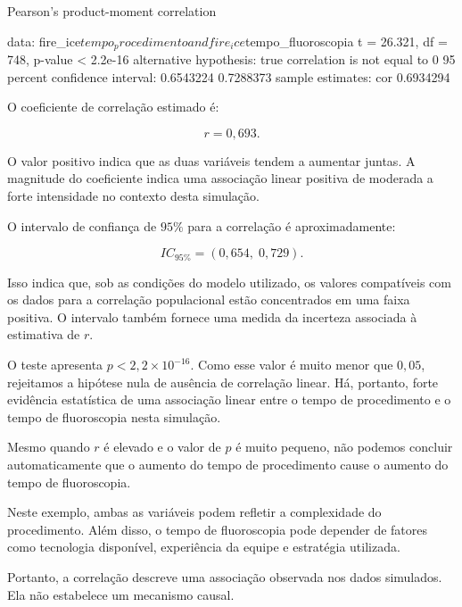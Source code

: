 \begin{code}
	Pearson's product-moment correlation

data:  fire_ice$tempo_procedimento and fire_ice$tempo_fluoroscopia
t = 26.321, df = 748, p-value < 2.2e-16
alternative hypothesis: true correlation is not equal to 0
95 percent confidence interval:
 0.6543224 0.7288373
sample estimates:
      cor 
0.6934294 
\end{code}

O coeficiente de correlação estimado é:

\[
r = 0{,}693.
\]

O valor positivo indica que as duas variáveis tendem a aumentar juntas.
A magnitude do coeficiente indica uma associação linear positiva de
moderada a forte intensidade no contexto desta simulação.

O intervalo de confiança de $95\%$ para a correlação é aproximadamente:

\[
IC_{95\%} = (0{,}654,\;0{,}729).
\]

Isso indica que, sob as condições do modelo utilizado, os valores
compatíveis com os dados para a correlação populacional estão concentrados
em uma faixa positiva. O intervalo também fornece uma medida da incerteza
associada à estimativa de $r$.

O teste apresenta $p < 2{,}2\times10^{-16}$. Como esse valor é muito menor
que $0{,}05$, rejeitamos a hipótese nula de ausência de correlação linear.
Há, portanto, forte evidência estatística de uma associação linear entre o
tempo de procedimento e o tempo de fluoroscopia nesta simulação.

\begin{error}

Mesmo quando $r$ é elevado e o valor de $p$ é muito pequeno, não podemos
concluir automaticamente que o aumento do tempo de procedimento cause o
aumento do tempo de fluoroscopia.

Neste exemplo, ambas as variáveis podem refletir a complexidade do
procedimento. Além disso, o tempo de fluoroscopia pode depender de fatores
como tecnologia disponível, experiência da equipe e estratégia utilizada.

Portanto, a correlação descreve uma associação observada nos dados simulados.
Ela não estabelece um mecanismo causal.
\end{error}

